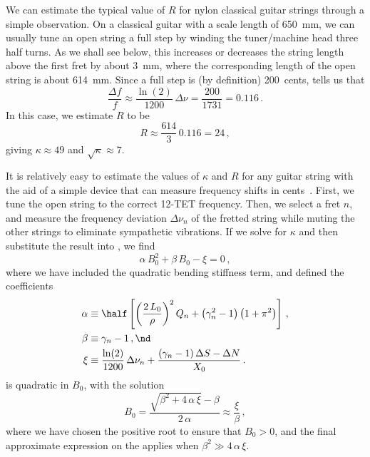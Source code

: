 We can estimate the typical value of $R$ for nylon classical guitar strings through a simple observation. On a classical guitar with a scale length of 650~mm, we can usually tune an open string a full step by winding the tuner/machine head three half turns. As we shall see below, this increases or decreases the string length above the first fret by about 3~mm, where the corresponding length of the open string is about 614~mm. Since a full step is (by definition) 200~cents,  tells us that
\begin{equation}
  \frac{\Delta f}{f} \approx \frac{\ln(2)}{1200}\, \Delta \nu = \frac{200}{1731} = 0.116\, .
\end{equation}
In this case, we estimate $R$ to be
\begin{equation}
  R \approx \frac{614}{3}\, 0.116 = 24\, ,
\end{equation}
giving $\kappa \approx 49$ and $\sqrt{\kappa} \approx 7$.

 It is relatively easy to estimate the values of $\kappa$ and $R$ for any guitar string with the aid of a simple device that can measure frequency shifts in cents~\cite{ref:pgtweb}. First, we tune the open string to the correct 12-TET frequency. Then, we select a fret $n$, and measure the frequency deviation $\Delta \nu_n$ of the fretted string while muting the other strings to eliminate sympathetic vibrations. If we solve  for $\kappa$ and then substitute the result into , we find
\begin{equation} \label{eqn:root_kappa_quad}
  \alpha\, B_0^2 + \beta\, B_0 - \xi = 0\, ,
\end{equation}
where we have included the quadratic bending stiffness term, and defined the coefficients
\begin{subequations}
  \begin{align}
    \alpha &\equiv \half \left[ \left(\frac{2\, L_0}{\rho}\right)^2 Q_n + \left(\gamma_n^2 - 1\right)\left(1 + \pi^2\right) \right]\, , \\
    \beta &\equiv \gamma_n - 1\, , \nd \\
    \xi &\equiv \frac{\ln(2)}{1200}\, \Delta \nu_n + \frac{\left(\gamma_n - 1\right) \Delta S - \Delta N}{X_0}\, .
\end{align}
\end{subequations}
 is quadratic in $B_0$, with the solution
 \begin{equation} \label{eqn:root_kappa_soln}
B_0 = \frac{\sqrt{\beta^2 + 4\, \alpha\, \xi} - \beta}{2\, \alpha} \approx \frac{\xi}{\beta}\, ,
 \end{equation}
where we have chosen the positive root to ensure that $B_0 > 0$, and the final approximate expression on the \rhs applies when $\beta^2 \gg 4\, \alpha\, \xi$.

